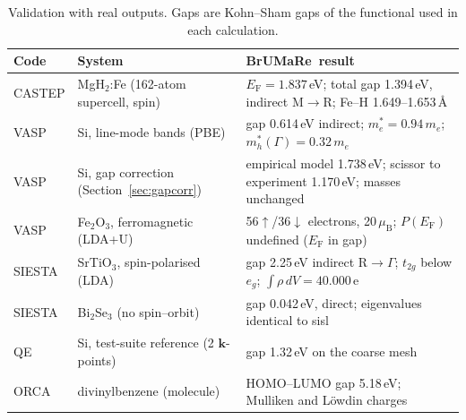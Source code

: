 \documentclass[11pt,a4paper]{article}
\newcommand{\eF}{E_\mathrm{F}}
\newcommand{\BMR}{\textsf{BrUMa\textcolor[HTML]{B26B00}{Re}}}
\begin{document}
\begin{table}[t]\centering\small
\caption{Validation with real outputs. Gaps are Kohn–Sham gaps of the functional used in each calculation.}\label{tab:valid}
\begin{tabularx}{\linewidth}{@{}llX@{}}\toprule
Code & System & \BMR\ result \\\midrule
CASTEP & MgH$_2$:Fe (162-atom supercell, spin) & $\eF=1.837$\,eV; total gap 1.394\,eV, indirect M$\to$R; Fe–H 1.649–1.653\,\AA \\
VASP & Si, line-mode bands (PBE) & gap 0.614\,eV indirect; $m^*_e=0.94\,m_e$; $m^*_h(\Gamma)=0.32\,m_e$ \\
VASP & Si, gap correction (Section~\ref{sec:gapcorr}) & empirical model 1.738\,eV; scissor to experiment 1.170\,eV; masses unchanged \\
VASP & Fe$_2$O$_3$, ferromagnetic (LDA+U) & 56$\uparrow$/36$\downarrow$ electrons, 20\,$\mu_\mathrm B$; $P(\eF)$ undefined ($\eF$ in gap) \\
SIESTA & SrTiO$_3$, spin-polarised (LDA) & gap 2.25\,eV indirect R$\to\Gamma$; $t_{2g}$ below $e_g$; $\int\rho\,dV=40.000$\,e \\
SIESTA & Bi$_2$Se$_3$ (no spin--orbit) & gap 0.042\,eV, direct; eigenvalues identical to sisl \\
QE & Si, test-suite reference (2 $\bm{k}$-points) & gap 1.32\,eV on the coarse mesh \\
ORCA & divinylbenzene (molecule) & HOMO–LUMO gap 5.18\,eV; Mulliken and Löwdin charges \\\bottomrule
\end{tabularx}
\end{table}
\end{document}
